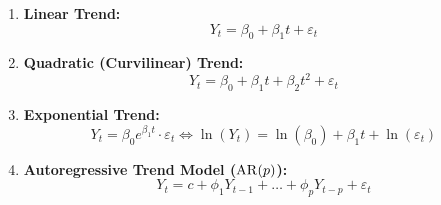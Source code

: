 \begin{formulabox}
\begin{enumerate}[leftmargin=*]
    \item \textbf{Linear Trend:}
    \begin{equation}
        Y_t = \beta_0 + \beta_1 t + \varepsilon_t
    \end{equation}
    \item \textbf{Quadratic (Curvilinear) Trend:}
    \begin{equation}
        Y_t = \beta_0 + \beta_1 t + \beta_2 t^2 + \varepsilon_t
    \end{equation}
    \item \textbf{Exponential Trend:}
    \begin{equation}
        Y_t = \beta_0 e^{\beta_1 t} \cdot \varepsilon_t \iff \ln(Y_t) = \ln(\beta_0) + \beta_1 t + \ln(\varepsilon_t)
    \end{equation}
    \item \textbf{Autoregressive Trend Model ($\operatorname{AR}(p)$):}
    \begin{equation}
        Y_t = c + \phi_1 Y_{t-1} + \dots + \phi_p Y_{t-p} + \varepsilon_t
    \end{equation}
\end{enumerate}
\end{formulabox}
